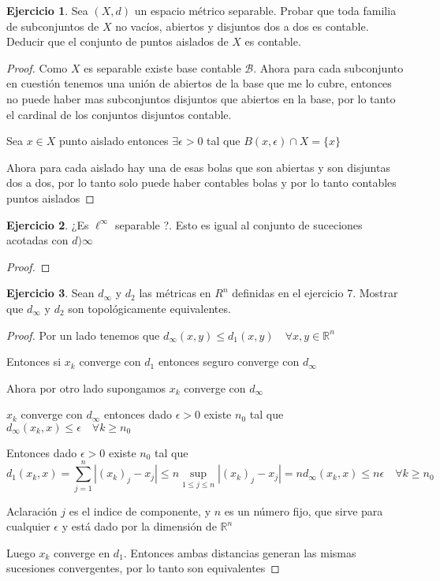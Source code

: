 \documentclass[12pt]{report}
\newcommand{\R}{\mathbb{R}}
\theoremstyle{definition}
\newtheorem{ej}{Ejercicio}
\begin{document}
\begin{ej}
	Sea $(X,d)$ un espacio métrico separable. Probar que toda familia de subconjuntos de $X$ no vacíos, abiertos y disjuntos dos a dos es contable. Deducir que el conjunto de puntos aislados de $X$ es contable.
	\begin{proof}
		Como $X$ es separable existe base contable $\mathcal{B}$. Ahora para cada subconjunto en cuestión tenemos una unión de abiertos de la base que me lo cubre, entonces no puede haber mas subconjuntos disjuntos que abiertos en la base, por lo tanto el cardinal de los conjuntos disjuntos contable.

		Sea $x \in X$ punto aislado entonces $\exists \epsilon >0$ tal que $B(x,\epsilon) \cap X = \{x\}$

		Ahora para cada aislado hay una de esas bolas que son abiertas y son disjuntas dos a dos, por lo tanto solo puede haber contables bolas y por lo tanto contables puntos aislados
	\end{proof}
\end{ej}

\begin{ej}
	¿Es $\ell^{\infty}$ separable ?. Esto es igual al conjunto de suceciones acotadas con $d){\infty}$
	\begin{proof}
		
	\end{proof}
	
	
\end{ej}




\begin{ej}
  Sean $d_{\infty}$ y $d_2$ las métricas en $R^n$ definidas en el ejercicio 7. Mostrar que $d_{\infty}$ y $d_2$ son topológicamente equivalentes.
\begin{proof}
  Por un lado tenemos que $d_{\infty}(x,y) \leq d_1(x,y) \quad \forall x,y \in \R^n$

  Entonces si $x_k$ converge con $d_1$ entonces seguro converge con $d_{\infty}$

  Ahora por otro lado supongamos $x_k$ converge con $d_{\infty}$ 


  $x_k$ converge con $d_{\infty}$ entonces dado $\epsilon >0$ existe $n_0$ tal que $d_{\infty}(x_k,x) \leq \epsilon \quad \forall k \geq n_0$

  Entonces dado $\epsilon > 0$ existe $n_0$ tal que 
  $$d_1(x_k,x) = \sum_{j=1}^{n} |(x_k)_j - x_j| \leq n\sup_{1 \leq j \leq n} |(x_k)_j - x_j| = nd_{\infty}(x_k,x) \leq n\epsilon \quad \forall k \geq n_0$$ 

  \noindent Aclaración $j$ es el indice de componente, y $n$ es un número fijo, que sirve para cualquier $\epsilon$ y está dado por la dimensión de $\R^n$

  Luego $x_k$ converge en $d_1$. Entonces ambas distancias generan las mismas sucesiones convergentes, por lo tanto son equivalentes
\end{proof}
\end{ej}
\end{document}
